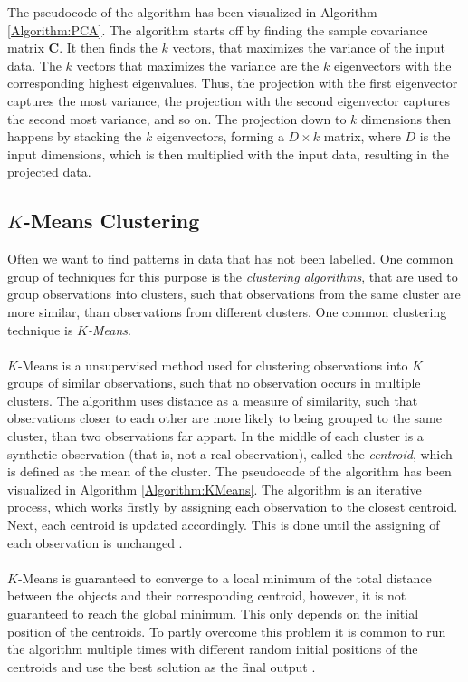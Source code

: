 \documentclass[./main.tex]{subfiles}
\begin{document}
The pseudocode of the algorithm has been visualized in Algorithm \ref{Algorithm:PCA}. The algorithm starts off by finding the sample covariance matrix $\bm{C}$. It then finds the $k$ vectors, that maximizes the variance of the input data. The $k$ vectors that maximizes the variance are the $k$ eigenvectors with the corresponding highest eigenvalues. Thus, the projection with the first eigenvector captures the most variance, the projection with the second eigenvector captures the second most variance, and so on. The projection down to $k$ dimensions then happens by stacking the $k$ eigenvectors, forming a $D \times k$ matrix, where $D$ is the input dimensions, which is then multiplied with the input data, resulting in the projected data. \cite{MAD_book}

\subsection{$K$-Means Clustering}\label{subsec:K_means}
Often we want to find patterns in data that has not been labelled. One common group of techniques for this purpose is the \textit{clustering algorithms}, that are used to group observations into clusters, such that observations from the same cluster are more similar, than observations from different clusters. One common clustering technique is $K$\textit{-Means}.
\\
\\
$K$-Means is a unsupervised method used for clustering observations into $K$ groups of similar observations, such that no observation occurs in multiple clusters. The algorithm uses distance as a measure of similarity, such that observations closer to each other are more likely to being grouped to the same cluster, than two observations far appart. In the middle of each cluster is a synthetic observation (that is, not a real observation), called the \textit{centroid}, which is defined as the mean of the cluster. The pseudocode of the algorithm has been visualized in Algorithm \ref{Algorithm:KMeans}. The algorithm is an iterative process, which works firstly by assigning each observation to the closest centroid. Next, each centroid is updated accordingly. This is done until the assigning of each observation is unchanged \cite{MAD_book}.
\\
\\
$K$-Means is guaranteed to converge to a local minimum of the total distance between the objects and their corresponding centroid, however, it is not guaranteed to reach the global minimum. This only depends on the initial position of the centroids. To partly overcome this problem it is common to run the algorithm multiple times with different random initial positions of the centroids and use the best solution as the final output \cite{MAD_book}.
\end{document}
